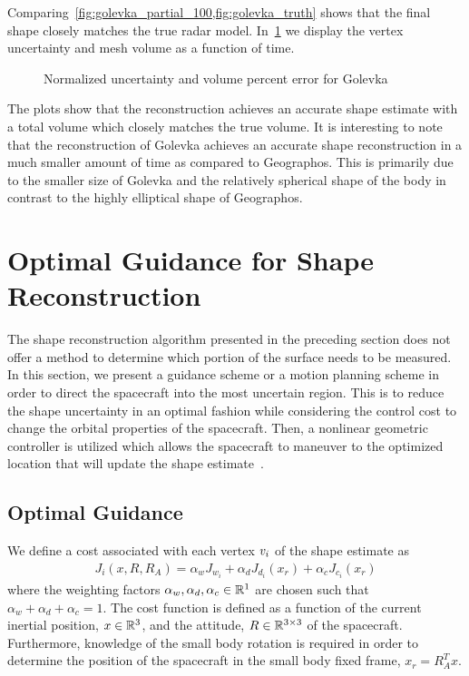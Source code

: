 \documentclass[journal]{new-aiaa}
\begin{document}
Comparing~\cref{fig:golevka_partial_100,fig:golevka_truth} shows that the final shape closely matches the true radar model.
In~\cref{fig:golevka_metrics} we display the vertex uncertainty and mesh volume as a function of time.

\begin{figure}[htbp]
    \centering
    
    \caption{Normalized uncertainty and volume percent error for Golevka\label{fig:golevka_metrics}}
\end{figure}

The plots show that the reconstruction achieves an accurate shape estimate with a total volume which closely matches the true volume.
It is interesting to note that the reconstruction of Golevka achieves an accurate shape reconstruction in a much smaller amount of time as compared to Geographos.
This is primarily due to the smaller size of Golevka and the relatively spherical shape of the body in contrast to the highly elliptical shape of Geographos.

\clearpage\newpage
\section{Optimal Guidance for Shape Reconstruction}\label{sec:explore_asteroid}

The shape reconstruction algorithm presented in the preceding section does not offer a method to determine which portion of the surface needs to be measured. 
In this section, we present a guidance scheme or a motion planning scheme in order to direct the spacecraft into the most uncertain region. 
This is to reduce the shape uncertainty in an optimal fashion while considering the control cost to change the orbital properties of the spacecraft. 
Then, a nonlinear geometric controller is utilized which allows the spacecraft to maneuver to the optimized location that will update the shape estimate~\cite{kulumani2017b}.

\subsection{Optimal Guidance}

We define a cost associated with each vertex \( v_i \) of the shape estimate as
\begin{align}\label{eq:explore_cost}
    J_i (x, R, R_A) = \alpha_w J_{w_i} + \alpha_d J_{d_i}(x_r) + \alpha_c J_{c_i}(x_r)
\end{align}
where the weighting factors \( \alpha_w, \alpha_d, \alpha_c \in \mathbb{R}^1 \) are chosen such that \( \alpha_w + \alpha_d + \alpha_c = 1 \).
The cost function is defined as a function of the current inertial position, \( x \in \mathbb{R}^3 \), and the attitude, \( R \in \mathbb{R}^{3\times3}\) of the spacecraft.
Furthermore, knowledge of the small body rotation is required in order to determine the position of the spacecraft in the small body fixed frame, \( x_r = R_A^T x\).
\end{document}

